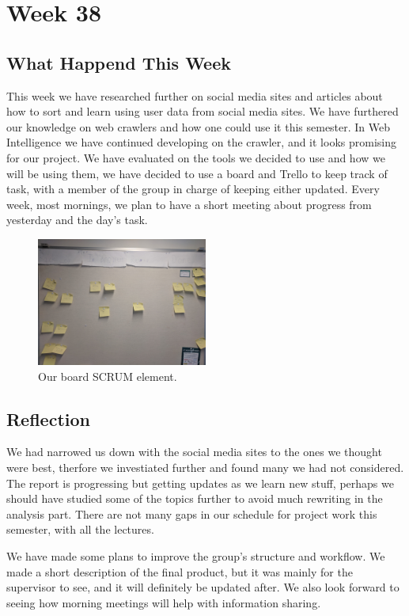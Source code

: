 \section*{Week 38} \subsection*{What Happend This Week} 
This week we have researched further on social media sites and articles about
how to sort and learn using user data from social media sites. We have furthered
our knowledge on web crawlers and how one could use it this semester. In Web
Intelligence we have continued developing on the crawler, and it looks promising
for our project. We have evaluated on the tools we decided to use and how we
will be using them, we have decided to use a board and Trello to keep track of
task, with a member of the group in charge of keeping either updated. Every
week, most mornings, we plan to have a short meeting about progress from
yesterday and the day's task.

\begin{figure}[H] \centering \includegraphics[width =
0.5\textwidth]{figures/Board.jpg}
	\caption{Our board SCRUM element.}
\end{figure}

\subsection*{Reflection}
We had narrowed us down with the social media sites to the ones we thought were
best, therfore we investiated further and found many we had not considered. The
report is progressing but getting updates as we learn new stuff, perhaps we
should have studied some of the topics further to avoid much rewriting in the
analysis part. There are not many gaps in our schedule for project work this
semester, with all the lectures.

We have made some plans to improve the group's structure and workflow. We made a
short description of the final product, but it was mainly for the supervisor to
see, and it will definitely be updated after. We also look forward to seeing how
morning meetings will help with information sharing.

